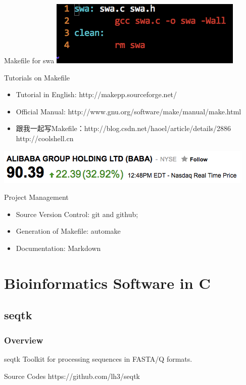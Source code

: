 \documentclass[UTF8]{beamer}
\begin{document}
\begin{frame}[t]{Makefile for swa}
\includegraphics[width=\textwidth]{swamakefile.png}
\end{frame}

\begin{frame}[t]{Tutorials on Makefile}
\begin{itemize}
  \item Tutorial in English: http://makepp.sourceforge.net/
  \item Official Manual: http://www.gnu.org/software/make/manual/make.html
  \item 跟我一起写Makefile：http://blog.csdn.net/haoel/article/details/2886\\
  http://coolshell.cn
\end{itemize}
\end{frame}

\begin{frame}[t]
  \centerline{\includegraphics[width=.8\textwidth]{baba.png}}
\end{frame}


\begin{frame}[t]{Project Management}
  \begin{itemize}
    \item Source Version Control: git and github;
    \item Generation of Makefile: automake
    \item Documentation: Markdown
  \end{itemize}
\end{frame}

\section{Bioinformatics Software in C}
\subsection{seqtk}
\begin{frame}
  \frametitle{Overview}
  \begin{block}{seqtk}
    Toolkit for processing sequences in FASTA/Q formats.
  \end{block}
  \begin{block}{Source Codes}
    https://github.com/lh3/seqtk
  \end{block}
\end{frame}
\end{document}
